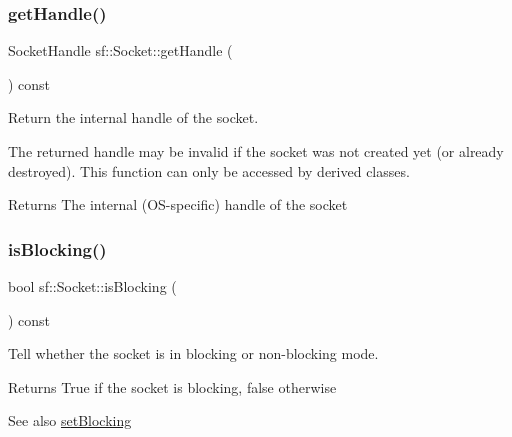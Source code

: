 \subsubsection{\texorpdfstring{getHandle()}{getHandle()}}
{\footnotesize\ttfamily Socket\+Handle sf\+::\+Socket\+::get\+Handle (\begin{DoxyParamCaption}{ }\end{DoxyParamCaption}) const\hspace{0.3cm}{\ttfamily [protected]}}



Return the internal handle of the socket. 

The returned handle may be invalid if the socket was not created yet (or already destroyed). This function can only be accessed by derived classes.

\begin{DoxyReturn}{Returns}
The internal (O\+S-\/specific) handle of the socket \begin{DoxyVerb}\end{DoxyVerb}
 
\end{DoxyReturn}
\mbox{\label{classsf_1_1_socket_ab1ceca9ac114b8baeeda3b34a0aca468}} 
\subsubsection{\texorpdfstring{isBlocking()}{isBlocking()}}
{\footnotesize\ttfamily bool sf\+::\+Socket\+::is\+Blocking (\begin{DoxyParamCaption}{ }\end{DoxyParamCaption}) const}



Tell whether the socket is in blocking or non-\/blocking mode. 

\begin{DoxyReturn}{Returns}
True if the socket is blocking, false otherwise
\end{DoxyReturn}
\begin{DoxySeeAlso}{See also}
\mbox{\hyperlink{classsf_1_1_socket_a165fc1423e281ea2714c70303d3a9782}{set\+Blocking}} \begin{DoxyVerb}\end{DoxyVerb}
 
\end{DoxySeeAlso}
\mbox{\label{classsf_1_1_socket_a165fc1423e281ea2714c70303d3a9782}} 
